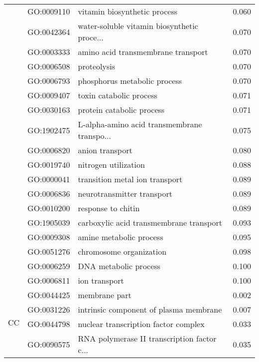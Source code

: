 \begin{longtable}{lllr}
   & GO:0009110 &                 vitamin biosynthetic process &         0.060 \\
   & GO:0042364 &  water-soluble vitamin biosynthetic proce... &         0.070 \\
   & GO:0003333 &           amino acid transmembrane transport &         0.070 \\
   & GO:0006508 &                                  proteolysis &         0.070 \\
   & GO:0006793 &                 phosphorus metabolic process &         0.070 \\
   & GO:0009407 &                      toxin catabolic process &         0.071 \\
   & GO:0030163 &                    protein catabolic process &         0.071 \\
   & GO:1902475 &  L-alpha-amino acid transmembrane transpo... &         0.075 \\
   & GO:0006820 &                              anion transport &         0.080 \\
   & GO:0019740 &                         nitrogen utilization &         0.088 \\
   & GO:0000041 &               transition metal ion transport &         0.089 \\
   & GO:0006836 &                   neurotransmitter transport &         0.089 \\
   & GO:0010200 &                           response to chitin &         0.089 \\
   & GO:1905039 &      carboxylic acid transmembrane transport &         0.093 \\
   & GO:0009308 &                      amine metabolic process &         0.095 \\
   & GO:0051276 &                      chromosome organization &         0.098 \\
   & GO:0006259 &                        DNA metabolic process &         0.100 \\
   & GO:0006811 &                                ion transport &         0.100 \\
\cline{1-4}
\multirow{7}{*}{CC} & GO:0044425 &                                membrane part &         0.002 \\
   & GO:0031226 &       intrinsic component of plasma membrane &         0.007 \\
   & GO:0044798 &         nuclear transcription factor complex &         0.033 \\
   & GO:0090575 &  RNA polymerase II transcription factor c... &         0.035 \\

\end{longtable}
